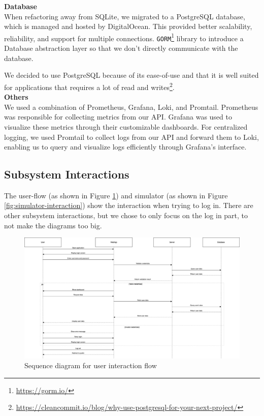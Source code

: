 \noindent \textbf{Database}
\\
When refactoring away from SQLite, we migrated to a PostgreSQL database, which is managed and hosted by DigitalOcean. This provided better scalability, reliability, and support for multiple connections. \texttt{GORM}\footnote{\url{https://gorm.io/}} library to introduce a Database abstraction layer so that we don't directly communicate with the database. 

We decided to use PostgreSQL because of its ease-of-use and that it is well suited for applications that requires a lot of read and writes\footnote{\url{https://cleancommit.io/blog/why-use-postgresql-for-your-next-project/}}.
\\

\noindent \textbf{Others}
\\
We used a combination of Prometheus, Grafana, Loki, and Promtail. Prometheus was responsible for collecting metrics from our API. Grafana was used to visualize these metrics through their customizable dashboards. For centralized logging, we used Promtail to collect logs from our API and forward them to Loki, enabling us to query and visualize logs efficiently through Grafana’s interface.


\subsection{Subsystem Interactions}
The user-flow (as shown in Figure \ref{fig:user-interaction}) and simulator (as shown in Figure \ref{fig:simulator-interaction}) show the interaction when trying to log in. There are other subsystem interactions, but we chose to only focus on the log in part, to not make the diagrams too big.

\begin{figure}[H]
  \centering
  \includegraphics[width=\textwidth]{images/flow.png}
  \caption{Sequence diagram for user interaction flow }
  \label{fig:user-interaction}
\end{figure}

